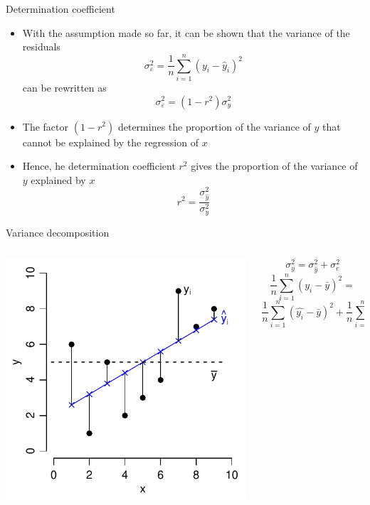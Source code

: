 \documentclass[aspectratio=169]{beamer}
\begin{document}
\begin{frame}{Determination coefficient}
  \begin{itemize}
    \item With the assumption made so far, it can be shown that the variance of
      the residuals
      \[
      \sigma_{\varepsilon}^2 = \frac{1}{n}\sum_{i=1}^n (y_i - \hat y_i)^2
      \]
      can be rewritten as
      \[
        \sigma_{\varepsilon}^2 = (1 - r^2) \sigma_y^2
      \]
    \item The factor $(1 - r^2)$ determines the proportion of the variance of
      $y$ that cannot be explained by the regression of $x$
    \item Hence, he determination coefficient $r^2$ gives the proportion of the
      variance of $y$ explained by $x$
      \[
        r^2 = \frac{\sigma_{\hat y}^2}{\sigma_{y}^2}
      \]
  \end{itemize}
\end{frame}

\begin{frame}{Variance decomposition}
\begin{columns}[c]
\begin{column}{6cm}
  \includegraphics[scale=.7]{../figures/obs_pred}
\end{column}
%
\begin{column}{5cm}
{\small
\[
  \sigma_y^2 = \sigma_{\hat y}^2 + \sigma_e^2
\]
\[
  \frac{1}{n} \sum_{i=1}^n (y_i - \bar{y})^2 =
\]
\[
  \frac{1}{n} \sum_{i=1}^n (\hat{y_i} - \bar{y})^2 +
  \frac{1}{n} \sum_{i=1}^n (y_i - \hat{y_i})^2
\]
}
\end{column}
\end{columns}
\vfill
\end{frame}
\end{document}
